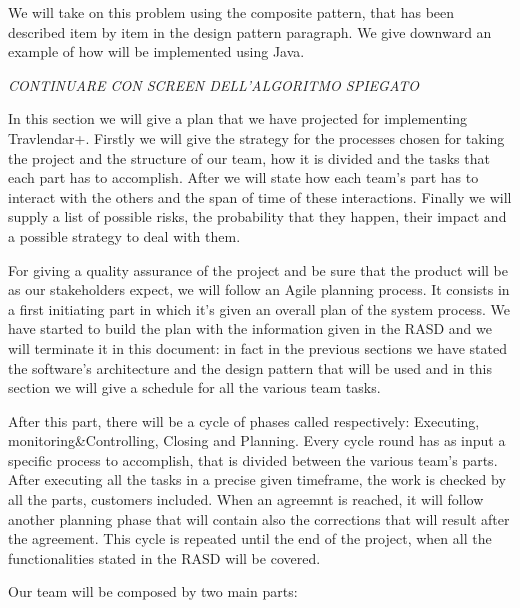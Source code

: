 We will take on this problem using the composite pattern, that has been described item by item in the design pattern paragraph. We give downward an example of how will be implemented using Java.


\emph{ \huge CONTINUARE CON SCREEN DELL'ALGORITMO SPIEGATO}

In this section we will give a plan that we have projected for implementing Travlendar+. 
Firstly we will give the strategy for the processes chosen for taking the project and the structure of our team, how it is divided and the tasks that each part has to accomplish.
After we will state how each team’s part has to interact with the others and the span of time of these interactions. 
Finally we will supply a list of possible risks, the probability that they happen, their impact and a possible strategy to deal with them.

For giving a quality assurance of the project and be sure that the product will be as our stakeholders expect, we will follow an Agile planning process. It consists in a first initiating part in which it’s given an overall plan of the system process. We have started to build the plan with the information given in the RASD and we will terminate it in this document: in fact in the previous sections we have stated the software’s architecture and the design pattern that will be used and in this section we will give a schedule for all the various team tasks.

After this part, there will be a cycle of phases called respectively: Executing, monitoring\&Controlling, Closing and Planning. 
Every cycle round has as input a specific process to accomplish, that is divided between the various team’s parts. After executing all the tasks in a precise given timeframe, the work is checked by all the parts, customers included. When an agreemnt is reached, it will follow another planning phase that will contain also the corrections that will result after the agreement.
This cycle is repeated until the end of the project, when all the functionalities stated in the RASD will be covered.

Our team will be composed by two main parts:

